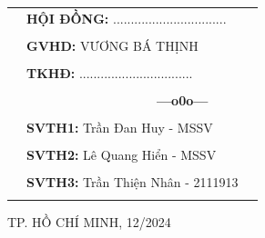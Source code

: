 \documentclass[a4paper]{article}
\theoremstyle{definition}
\begin{document}
\begin{titlepage}
\begin{table}[h]
\begin{tabular}{rll}
\hspace{6 cm} &  \textbf{\Large HỘI ĐỒNG:} {\Large ................................}
\\
\\
\hspace{6 cm} &   \textbf{\Large GVHD:} {\Large VƯƠNG BÁ THỊNH}
\\
\\
\hspace{6 cm}  &   \textbf{\Large TKHĐ:} {\Large ................................}
\\
\\
\hspace{6 cm} &     \textbf{$\;$ $\;$$\;$$\;$$\;$$\;$$\;$$\;$$\;$$\;$$\;$$\;$$\;$$\;$$\;$$\;$$\;$$\;$$\;$$\;$$\;$$\;$$\;$$\;$$\;$$\;$$\;$$\;$$\;$$\;$$\;$$\;$$\;$$\;$ \Large ---o0o---} 
\\
\\
\hspace{6 cm} &   \textbf{\Large SVTH1:} {\Large Trần Đan Huy - MSSV}
\\
\\
\hspace{6 cm}&   \textbf{\Large SVTH2:}  {\Large Lê Quang Hiển - MSSV}
\\
\\
\hspace{6 cm} &   \textbf{\Large SVTH3:}  {\Large Trần Thiện Nhân - 2111913}
\\
\\

\end{tabular}
\end{table}

\vspace{0.5cm}
\begin{center}
{\Large TP. HỒ CHÍ MINH, 12/2024}
\end{center}
\end{titlepage}
\newpage




\newpage
\tableofcontents
\newpage
\listoffigures
\newpage
\listoftables
\newpage
\setcounter{page}{1}


\newpage

\newpage

\newpage

\newpage

\newpage



\newpage

\end{document}
